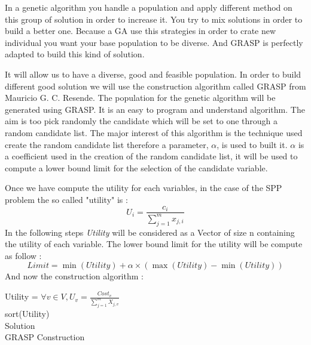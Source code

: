 \documentclass[12pt]{article}
\begin{document}
	In a genetic algorithm you handle a population and apply different method on this group of solution in order to increase it. You try to mix solutions in order to build a better one. Because a GA use this strategies in order to crate new individual you want your base population to be diverse. And GRASP is perfectly adapted to build this kind of solution.
	
	It will allow us  to have a diverse, good and feasible population. 
	In order to build different good solution we will use the construction algorithm
	called GRASP from Mauricio G. C. Resende.
	The population for the genetic algorithm will be generated using GRASP.
	It is an easy to program and understand algorithm. The aim is too pick randomly the
	candidate which will be set to one through a random candidate list. 
	The major interest of this algorithm is the technique used create the random
	candidate list therefore a parameter, $ \alpha$, is used to built it. 
	$ \alpha$ is a coefficient used in the creation of the random candidate list, it
	will be used to compute a lower bound limit for the selection of the candidate
	variable. 
	
	Once we have compute the utility for each variables, in the case of the SPP problem
	the so called "utility" is :
	$$
	U_i =  \frac{c_i}{ \sum\limits_{j=1}^m x_{j,i}} 
	$$
	In the following steps \textit{Utility} will be considered as a Vector of size n
	containing the utility of each variable.
	The lower bound limit for the utility will be compute as follow : \\
	$$
	Limit = \min{(Utility)} + \alpha \times (\max{(Utility)} - \min{(Utility)})
	$$
	And now the construction algorithm :
	
	
	\vspace{10pt}
	
	\begin{algorithm}[H]
		Utility = $\forall  v  \in V, U_v=\frac{Cost_v}{\sum\limits_{j=1}^m X_{j,v}} $\\
		sort(Utility)\\
		\Return Solution\\
		
		\caption{GRASP Construction}
	\end{algorithm}
\pagebreak
\end{document}
